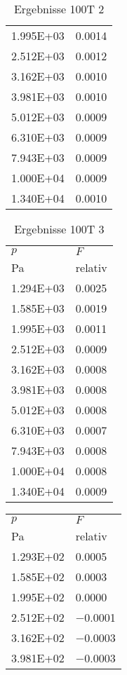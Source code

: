 \begin{table}
\begin{tabular}{l l }
\num{1.995E+03}&\num{0.0014}\\
\num{2.512E+03}&\num{0.0012}\\
\num{3.162E+03}&\num{0.0010}\\
\num{3.981E+03}&\num{0.0010}\\
\num{5.012E+03}&\num{0.0009}\\
\num{6.310E+03}&\num{0.0009}\\
\num{7.943E+03}&\num{0.0009}\\
\num{1.000E+04}&\num{0.0009}\\
\num{1.340E+04}&\num{0.0010}\\
\bottomrule
\end{tabular}\caption{Ergebnisse 100T 2}\end{table}\begin{table}\begin{tabular}{l l }
\toprule
$p$&$F$\\
 Pa & relativ \\\midrule
\num{1.294E+03}&\num{0.0025}\\
\num{1.585E+03}&\num{0.0019}\\
\num{1.995E+03}&\num{0.0011}\\
\num{2.512E+03}&\num{0.0009}\\
\num{3.162E+03}&\num{0.0008}\\
\num{3.981E+03}&\num{0.0008}\\
\num{5.012E+03}&\num{0.0008}\\
\num{6.310E+03}&\num{0.0007}\\
\num{7.943E+03}&\num{0.0008}\\
\num{1.000E+04}&\num{0.0008}\\
\num{1.340E+04}&\num{0.0009}\\
\bottomrule
\end{tabular}\caption{Ergebnisse 100T 3}\end{table}\begin{table}\begin{tabular}{l l }
\toprule
$p$&$F$\\
 Pa & relativ \\\midrule
\num{1.293E+02}&\num{0.0005}\\
\num{1.585E+02}&\num{0.0003}\\
\num{1.995E+02}&\num{0.0000}\\
\num{2.512E+02}&\num{-0.0001}\\
\num{3.162E+02}&\num{-0.0003}\\
\num{3.981E+02}&\num{-0.0003}\\

\end{tabular}
\end{table}
